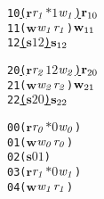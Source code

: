 \newsavebox{\boxtwono}
\begin{lrbox}{\boxtwono}
\begin{minipage}[t]{0.65\linewidth}
\large
\begin{alltt}
10 \underline{(\(\mathbf{r}\) \(\mathit{r\sb{1}}\) \(\mathit{\ast 1}\) \(\mathit{w\sb{1}}\)) \(\mathbf{r}\sb{10}\)}
11 (\(\mathbf{w}\) \(\mathit{w\sb{1}}\) \(\mathit{r\sb{1}}\)) \(\mathbf{w}\sb{11}\)
12 \underline{(\(\mathbf{s}\) \(\mathit{1 2}\)) \(\mathbf{s}\sb{12}\)}
\end{alltt}
\end{minipage}
\end{lrbox}

\newsavebox{\boxthreeno}
\begin{lrbox}{\boxthreeno}
\begin{minipage}[t]{0.65\linewidth}
\large
\begin{alltt}
20 \underline{(\(\mathbf{r}\) \(\mathit{r\sb{2}}\) \(\mathit{1 2}\) \(\mathit{w\sb{2}}\)) \(\mathbf{r}\sb{20}\)}
21 (\(\mathbf{w}\) \(\mathit{w\sb{2}}\) \(\mathit{r\sb{2}}\)) \(\mathbf{w}\sb{21}\)
22 \underline{(\(\mathbf{s}\) \(\mathit{2 0}\)) \(\mathbf{s}\sb{22}\)}
\end{alltt}
\end{minipage}
\end{lrbox}


\newcommand\examplefigfour{
\begin{figure*}[tb]
\begin{center}
\setlength{\tabcolsep}{2pt}
\begin{tabular}[t]{c|c|c}
$p_0$ & $p_1$ & $p_2$ \\
\hline
\scalebox{0.8}{\usebox{\boxoneno}}&
\scalebox{0.8}{\usebox{\boxtwono}} &
\scalebox{0.8}{\usebox{\boxthreeno}}\\
\end{tabular}
\end{center}
\caption{No Deadlock Caused by Circular Dependency in Messages}
\label{fig:nodeadlock2}
\end{figure*}
}

\newsavebox{\boxonezerobuffer}
\begin{lrbox}{\boxonezerobuffer}
\begin{minipage}[t]{0.65\linewidth}
\large
\begin{alltt}
00 (\(\mathbf{r}\) \(\mathit{r\sb{0}}\) \(\mathit{\ast 0}\) \(\mathit{w\sb{0}}\)) 
01 (\(\mathbf{w}\) \(\mathit{w\sb{0}}\) \(\mathit{r\sb{0}}\))
02 (\(\mathbf{s}\) \(\mathit{0 1}\)) 
03 (\(\mathbf{r}\) \(\mathit{r\sb{1}}\) \(\mathit{\ast 0}\) \(\mathit{w\sb{1}}\)) 
04 (\(\mathbf{w}\) \(\mathit{w\sb{1}}\) \(\mathit{r\sb{1}}\))
\end{alltt}
\end{minipage}
\end{lrbox}

